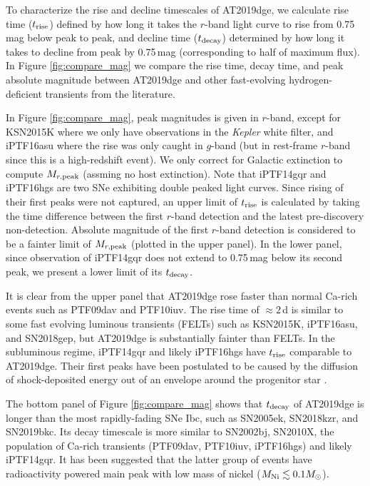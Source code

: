 \documentclass[twocolumn]{aastex63}
\begin{document}
\begin{CJK*}{UTF8}{gbsn}
To characterize the rise and decline timescales of AT2019dge, we calculate rise time ($t_{\rm rise}$) 
defined by how long it takes the $r$-band light curve to rise from 0.75\,mag below peak to peak, 
and decline time ($t_{\rm decay}$) determined by how long it takes to decline from peak by 0.75\,mag 
(corresponding to half of maximum flux). In Figure \ref{fig:compare_mag} we compare the rise time, 
decay time, and peak absolute magnitude between AT2019dge and other fast-evolving 
hydrogen-deficient transients from the literature. 

In Figure \ref{fig:compare_mag}, peak magnitudes is given in $r$-band, except for KSN2015K where we 
only have observations in the \textit{Kepler} white filter, and iPTF16asu where the rise was only 
caught in $g$-band (but in rest-frame $r$-band since this is a high-redshift event). We only correct 
for Galactic extinction to compute $M_{r\rm , peak}$ (assming no host extinction). Note that 
iPTF14gqr and iPTF16hgs are two SNe exhibiting double peaked light curves. Since rising of their first 
peaks were not captured, an upper limit of $t_{\rm rise}$ is calculated by taking the time difference 
between the first $r$-band detection and the latest pre-discovery non-detection. Absolute magnitude 
of the first $r$-band detection is considered to be a fainter limit of $M_{r\rm , peak}$ (plotted in the 
upper panel). In the lower panel, since observation of iPTF14gqr does not extend to 0.75\,mag below 
its second peak, we present a lower limit of its $t_{\rm decay}$.

It is clear from the upper panel that AT2019dge rose faster than normal Ca-rich events such as 
PTF09dav and PTF10iuv. The rise time of $\approx 2$\,d is similar to some fast evolving luminous 
transients (FELTs) such as KSN2015K, iPTF16asu, and SN2018gep, but AT2019dge is substantially 
fainter than FELTs. In the subluminous regime, iPTF14gqr and likely iPTF16hgs have $t_{\rm rise}$ 
comparable to AT2019dge. Their first peaks have been postulated to be caused by the diffusion of 
shock-deposited energy out of an envelope around the progenitor star \citep{De2018, DeKC2018}.
 
The bottom panel of Figure \ref{fig:compare_mag} shows that $t_{\rm decay}$ of AT2019dge is 
longer than the most rapidly-fading SNe Ibc, such as SN2005ek, SN2018kzr, 
and SN2019bkc. Its decay timescale is more similar to SN2002bj, SN2010X, the population of Ca-rich 
transients (PTF09dav, PTF10iuv, iPTF16hgs) and likely iPTF14gqr. It has been suggested that the latter 
group of events have radioactivity powered main peak with low mass of nickel ($M_{\rm Ni} \lesssim 0.1 
M_\odot$).


\end{CJK*}
\end{document}

